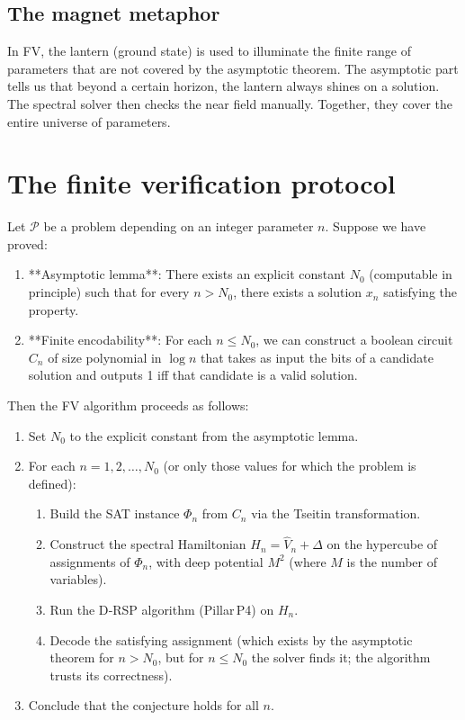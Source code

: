 \documentclass[11pt,a4paper]{article}
\begin{document}
\subsection{The magnet metaphor}

In FV, the lantern (ground state) is used to illuminate the finite range of parameters that are not covered by the asymptotic theorem. The asymptotic part tells us that beyond a certain horizon, the lantern always shines on a solution. The spectral solver then checks the near field manually. Together, they cover the entire universe of parameters.

\section{The finite verification protocol}

Let \(\mathcal{P}\) be a problem depending on an integer parameter \(n\). Suppose we have proved:

\begin{enumerate}
\item **Asymptotic lemma**: There exists an explicit constant \(N_0\) (computable in principle) such that for every \(n > N_0\), there exists a solution \(x_n\) satisfying the property.
\item **Finite encodability**: For each \(n \le N_0\), we can construct a boolean circuit \(C_n\) of size polynomial in \(\log n\) that takes as input the bits of a candidate solution and outputs 1 iff that candidate is a valid solution.
\end{enumerate}

Then the FV algorithm proceeds as follows:

\begin{enumerate}
\item Set \(N_0\) to the explicit constant from the asymptotic lemma.
\item For each \(n = 1,2,\dots,N_0\) (or only those values for which the problem is defined):
   \begin{enumerate}
   \item Build the SAT instance \(\Phi_n\) from \(C_n\) via the Tseitin transformation.
   \item Construct the spectral Hamiltonian \(H_n = \hat{V}_n + \Delta\) on the hypercube of assignments of \(\Phi_n\), with deep potential \(M^2\) (where \(M\) is the number of variables).
   \item Run the D‑RSP algorithm (Pillar P4) on \(H_n\).
   \item Decode the satisfying assignment (which exists by the asymptotic theorem for \(n > N_0\), but for \(n \le N_0\) the solver finds it; the algorithm trusts its correctness).
   \end{enumerate}
\item Conclude that the conjecture holds for all \(n\).
\end{enumerate}
\end{document}
